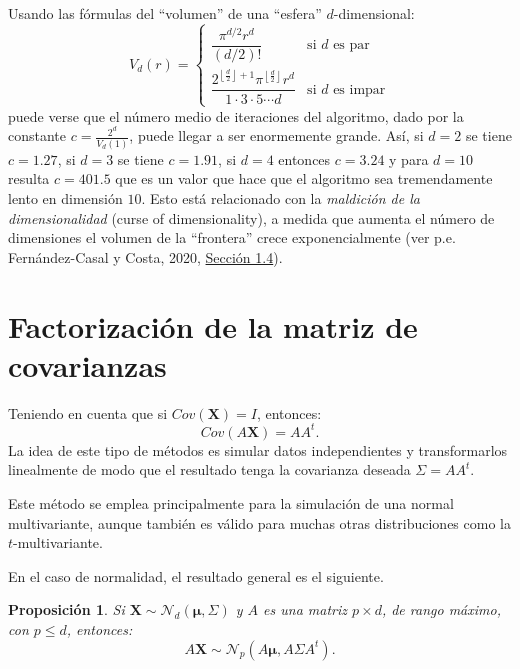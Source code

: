 \documentclass[
]{book}
\theoremstyle{break}
\newtheorem{proposition}{Proposición}[chapter]
\theoremstyle{definition}
\theoremstyle{definition}
\theoremstyle{definition}
\theoremstyle{definition}
\theoremstyle{remark}
\begin{document}
Usando las fórmulas del ``volumen'' de una ``esfera'' \(d\)-dimensional:
\[V_d\left( r\right)  =\left\{
\begin{array}{ll}
\dfrac{\pi^{d/2}r^{d}}{\left( d/2\right)  !} & \text{si } d \text{ es par}\\
\dfrac{2^{\left\lfloor \frac{d}{2}\right\rfloor +1}\pi^{\left\lfloor \frac{d}{2}\right\rfloor }r^{d}}{1\cdot3\cdot5\cdots d} & \text{si } d \text{ es impar}
\end{array}\right.\]
puede verse que el número medio de iteraciones del algoritmo, dado por la constante
\(c=\frac{2^{d}}{V_d\left(1 \right)}\), puede llegar a ser enormemente grande.
Así, si \(d=2\) se tiene \(c=1.27\), si \(d=3\) se tiene \(c=1.91\), si \(d=4\) entonces \(c=3.24\) y para
\(d=10\) resulta \(c=401.5\) que es un valor que hace que el algoritmo sea
tremendamente lento en dimensión \(10\).
Esto está relacionado con la \emph{maldición de la dimensionalidad} (curse of dimensionality), a medida que aumenta el número de dimensiones el volumen de la ``frontera'' crece exponencialmente (ver p.e. Fernández-Casal y Costa, 2020, \href{https://rubenfcasal.github.io/aprendizaje_estadistico/dimen-curse.html}{Sección 1.4}).

\hypertarget{fact-cov}{%
\section{Factorización de la matriz de covarianzas}\label{fact-cov}}

Teniendo en cuenta que si \(Cov(\mathbf{X})= I\), entonces:
\[Cov(A\mathbf{X}) = AA^t.\]
La idea de este tipo de métodos es simular datos independientes y transformarlos linealmente de modo que el resultado tenga la covarianza deseada \(\Sigma = AA^t\).

Este método se emplea principalmente para la simulación de una
normal multivariante, aunque también es válido para muchas otras
distribuciones como la \(t\)-multivariante.

En el caso de normalidad, el resultado general es el siguiente.

\begin{proposition}
\protect\hypertarget{prp:unnamed-chunk-4}{}{\label{prp:unnamed-chunk-4} }
Si \(\mathbf{X} \sim \mathcal{N}_d\left( \boldsymbol\mu,\Sigma \right)\) y \(A\) es una matriz \(p\times d\), de
rango máximo, con \(p\leq d\), entonces:
\[A\mathbf{X} \sim \mathcal{N}_{p}\left(A\boldsymbol\mu,A\Sigma A^t\right).\]
\end{proposition}
\end{document}
